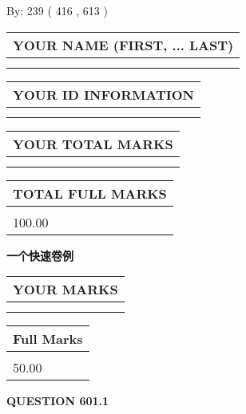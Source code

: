 \documentclass{ctexart}
\begin{document}
   
\hspace{1.0in} By: 
 239 ( 416 ,  613 )
   
   
   
   
\newpage 
\setcounter{page}{ 
   601001 } 
   
   
   
   
\noindent\begin{tabular}{|l|}
\hline
YOUR NAME (FIRST, ... LAST)  \\
\hline
 \\ 
 \\ 
\hline
\end{tabular}
\hspace{0.05in} \begin{tabular}{|l|}
\hline
 YOUR   ID   INFORMATION  \\
\hline
 \\ 
 \\ 
\hline
\end{tabular}
   
   
\vspace{0.2in}\noindent\begin{tabular}{|l|}
\hline
YOUR TOTAL MARKS  \\
\hline
 \\ 
 \\ 
\hline
\end{tabular}
\hspace{0.05in} \begin{tabular}{|l|}
\hline
TOTAL FULL MARKS  \\
\hline
 \\ 
100.00 \\
\hline
\end{tabular}
   
   
 \vspace{0.2in}
{\LARGE {\textbf{ 一个快速卷例}}}
   
   
  
\vspace{0.2in}
  
\noindent\begin{tabular}{|l|}
\hline
 YOUR MARKS  \\
\hline
 \\ 
 \\ 
\hline
\end{tabular}
\hspace{0.05in} \begin{tabular}{|l|}
\hline
 Full Marks  \\
\hline
 \\ 
50.00 \\
\hline
\end{tabular}
{\textbf{\Large{QUESTION
601.1 
}}}
  
\end{document}
